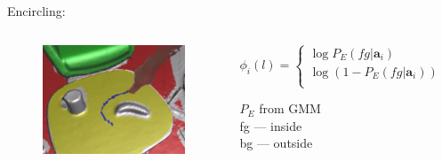 \documentclass[mathserif, 10pt]{beamer}
\begin{document}
\begin{frame}
  \vspace{0.5cm}
  Encircling:
  \vspace{-0.5cm}
    \begin{columns}
   \begin{column}{0.25\textwidth}
    \begin{figure}
    \includegraphics[width=\textwidth]{figures/circle}
    \end{figure}
   \end{column}
    \begin{column}{0.75\textwidth}
      \begin{equation}
  \phi_i(l) =
    \begin{cases}
      \log P_E(fg|\mathbf{a}_i)       & \quad \text{if } l = \text{fg}\\
      \log (1 - P_E(fg|\mathbf{a}_i))  & \quad \text{if } l = \text{bg}\\
    \end{cases}
  \end{equation}
  
  \center
  $P_E$ from GMM\\
  fg --- inside\\
  bg --- outside
   \end{column}

  \end{columns}

\end{frame}
\end{document}

